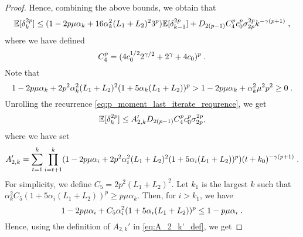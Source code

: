 \begin{proof}
    Hence, combining the above bounds, we obtain that 
    \begin{equation}
    \label{eq:p_moment_last_iterate_requrence}
   \mathbb{E}[\delta_k^{2p}]\leq (1 - 2p\mu\alpha_k + 16 \alpha_k^2 (L_1+L_2)^2 3^{p})\mathbb{E}[\delta_{k-1}^{2p}] + D_{2(p-1)} C_{4}^{p} c_0^p\sigma_{2p}^{2p}k^{-\gamma (p+1)}\;,
   \end{equation}
    where we have defined 
    \begin{equation}
    \label{eq:C_4_const_def}
    C_4^p = (4c_0^{1/2}2^{\gamma/2}+2^{\gamma}+ 4c_0)^p\;.
    \end{equation}
    Note that 
    \begin{equation}
        1 - 2p\mu\alpha_k + 2 p^2\alpha_k^2 (L_1+L_2)^2(1+5\alpha_k(L_1+L_2))^{p} > 1-2p\mu\alpha_k + \alpha_k^2\mu^2p^2 \geq 0\;.
    \end{equation}
    Unrolling the recurrence \eqref{eq:p_moment_last_iterate_requrence}, we get 
    \begin{equation}
       \mathbb{E}[\delta_k^{2p}] \leq A_{2,k}'D_{2(p-1)}C_4^pc_0^p\sigma_{2p}^{2p}, 
    \end{equation}
    where we have set 
    \begin{equation}
    \label{eq:A_2_k'_def}
        A_{2,k}' = \sum_{t=1}^k\prod_{i=t+1}^k(1 - 2p\mu\alpha_i + 2 p^2\alpha_i^2 (L_1+L_2)^2(1+5\alpha_i(L_1+L_2))^{p})(t+k_0)^{-\gamma(p+1)}\;.
    \end{equation}
    For simplicity, we define $C_{5}=2p^2(L_1+L_2)^2$. Let $k_1$ is the largest $k$ such that $\alpha_k^2C_5(1+5\alpha_i(L_1+L_2))^{p} \geq p\mu\alpha_k$. Then, for $i > k_1$, we have
    \begin{equation}
        1 - 2p\mu\alpha_i + C_5 \alpha_i^2 (1+5\alpha_i(L_1+L_2))^{p}\leq 1-p\mu\alpha_i \;.
    \end{equation}
Hence, using the definition of $A_{2,k}'$ in \eqref{eq:A_2_k'_def}, we get 


\end{proof}

